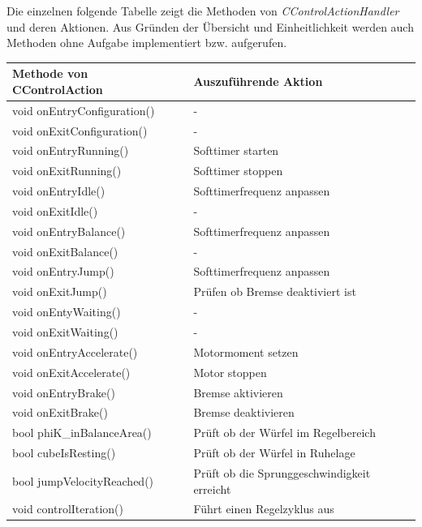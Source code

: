 \documentclass{article}
\begin{document}
\newpage
Die einzelnen folgende Tabelle zeigt die Methoden von \textit{CControlActionHandler} und deren Aktionen. Aus Gründen der Übersicht und Einheitlichkeit werden auch Methoden ohne Aufgabe implementiert bzw. aufgerufen.
\begin{table}[h]
\centering
\label{my-label}
\begin{tabular}{|>{\small}l|>{\small}l|}
\hline
\textbf{Methode von CControlAction} & \textbf{Auszuführende Aktion}               \\ \hline
void onEntryConfiguration()         & -                                           \\ \hline
void onExitConfiguration()          & -                                           \\ \hline
void onEntryRunning()               & Softtimer starten                           \\ \hline
void onExitRunning()                & Softtimer stoppen                           \\ \hline
void onEntryIdle()                  & Softtimerfrequenz anpassen                  \\ \hline
void onExitIdle()                   & -                                           \\ \hline
void onEntryBalance()               & Softtimerfrequenz anpassen                  \\ \hline
void onExitBalance()                & -                                           \\ \hline
void onEntryJump()                  & Softtimerfrequenz anpassen                  \\ \hline
void onExitJump()                   & Prüfen ob Bremse deaktiviert ist            \\ \hline
void onEntyWaiting()                & -                                           \\ \hline
void onExitWaiting()                & -                                           \\ \hline
void onEntryAccelerate()            & Motormoment setzen                          \\ \hline
void onExitAccelerate()             & Motor stoppen                               \\ \hline
void onEntryBrake()                 & Bremse aktivieren                           \\ \hline
void onExitBrake()                  & Bremse deaktivieren                         \\ \hline
bool phiK\_inBalanceArea()          & Prüft ob der Würfel im Regelbereich         \\ \hline
bool cubeIsResting()                & Prüft ob der Würfel in Ruhelage             \\ \hline
bool jumpVelocityReached()          & Prüft ob die Sprunggeschwindigkeit erreicht \\ \hline
void controlIteration()             & Führt einen Regelzyklus aus                 \\ \hline
\end{tabular}
\end{table}
\end{document}

